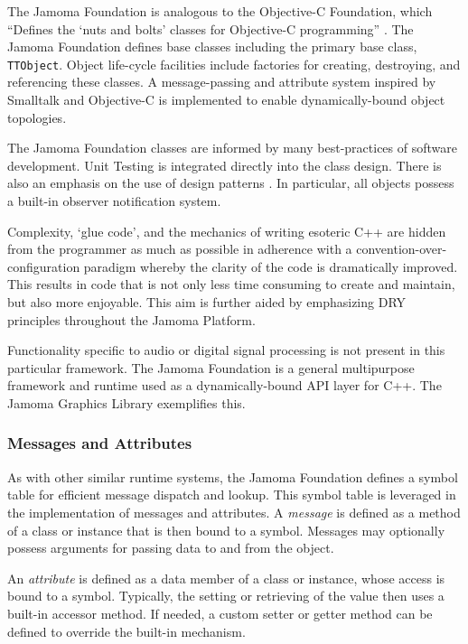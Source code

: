 \documentclass[twoside,10pt]{article}
\begin{document}
The Jamoma Foundation \cite{web7} is analogous to the Objective-C Foundation, which ``Defines the `nuts and bolts' classes for Objective-C programming'' \cite{web8}.  The Jamoma Foundation defines base classes including the primary base class, \texttt{\small{TTObject}}.  Object life-cycle facilities include factories for creating, destroying, and referencing these classes.  A message-passing and attribute system inspired by Smalltalk and Objective-C is implemented to enable dynamically-bound object topologies.  

The Jamoma Foundation classes are informed by many best-practices of software development.  Unit Testing is integrated directly into the class design.  There is also an emphasis on the use of design patterns \cite{Gamma:1995}.  In particular, all objects possess a built-in observer notification system.  

Complexity, `glue code', and the mechanics of writing esoteric C++ are hidden from the programmer as much as possible in adherence with a convention-over-configuration paradigm whereby the clarity of the code is dramatically improved.  This results in code that is not only less time consuming to create and maintain, but also more enjoyable.  This aim is further aided by emphasizing DRY principles throughout the Jamoma Platform.

Functionality specific to audio or digital signal processing is not present in this particular framework.  The Jamoma Foundation is a general multipurpose framework and runtime used as a dynamically-bound API layer for C++.  The Jamoma Graphics Library exemplifies this.

\subsubsection{Messages and Attributes} %

As with other similar runtime systems, the Jamoma Foundation defines a symbol table for efficient message dispatch and lookup.  This symbol table is leveraged in the implementation of messages and attributes.  
A \emph{message} is defined as a method of a class or instance that is then bound to a symbol.  Messages may optionally possess arguments for passing data to and from the object.

An \emph{attribute} is defined as a data member of a class or instance, whose access is bound to a symbol.  Typically, the setting or retrieving of the value then uses a built-in accessor method.  If needed, a custom setter or getter method can be defined to override the built-in mechanism.
\end{document}
